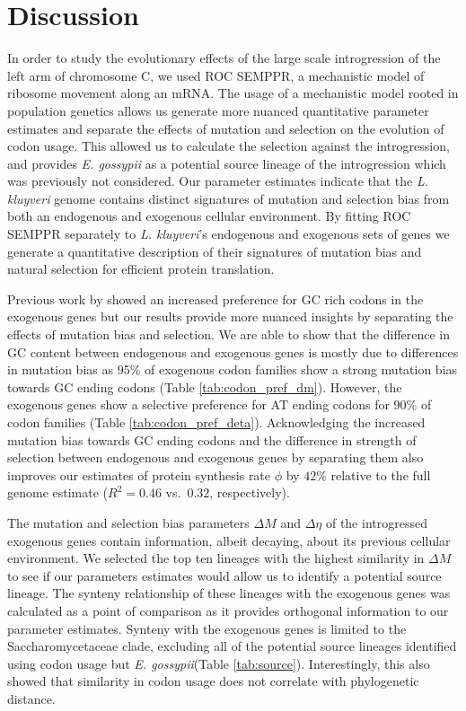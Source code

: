 \documentclass{bmcart}
\newcommand{\kluyveri}{\textit{L. kluyveri}\xspace}
\newcommand{\gossypii}{\textit{E. gossypii}\xspace}
\newcommand{\ROC}{ROC SEMPPR\xspace}
\newcommand{\GC}{GC content\xspace}
\newcommand{\DM}{\ensuremath{{\Delta M}}\xspace}
\newcommand{\DE}{\ensuremath{{\Delta \eta}}\xspace}
\begin{document}
\section*{Discussion}
In order to study the evolutionary effects of the large scale introgression of the left arm of chromosome C, we used \ROC, a mechanistic model of ribosome movement along an mRNA.
The usage of a mechanistic model rooted in population genetics allows us generate more nuanced quantitative parameter estimates and separate the effects of mutation and selection on the evolution of codon usage.
This allowed us to calculate the selection against the introgression, and provides \gossypii as a potential source lineage of the introgression which was previously not considered.
Our parameter estimates indicate that the \kluyveri genome contains distinct signatures of mutation and selection bias from both an endogenous and exogenous cellular environment.
By fitting \ROC separately to \kluyveri's endogenous and exogenous sets of genes we generate a quantitative description of their signatures of mutation bias and natural selection for efficient protein translation.

Previous work by \cite{payen2009} showed an increased preference for GC rich codons in the exogenous genes but our results provide more nuanced insights by separating the effects of mutation bias and selection.
We are able to show that the difference in \GC between endogenous and exogenous genes is mostly due to differences in mutation bias as 95\% of exogenous codon families show a strong mutation bias towards GC ending codons (Table \ref{tab:codon_pref_dm}).
However, the exogenous genes show a selective preference for AT ending codons for 90\% of codon families (Table \ref{tab:codon_pref_deta}).
Acknowledging the increased mutation bias towards GC ending codons and the difference in strength of selection between endogenous and exogenous genes by separating them also improves our estimates of protein synthesis rate $\phi$ by $42 \%$ relative to the full genome estimate ($R^2 = 0.46$ vs.~$0.32$, respectively).

The mutation and selection bias parameters \DM and \DE of the introgressed exogenous genes contain information, albeit decaying, about its previous cellular environment.
We selected the top ten lineages with the highest similarity in \DM to see if our parameters estimates would allow us to identify a potential source lineage.
The synteny relationship of these lineages with the exogenous genes was calculated as a point of comparison as it provides orthogonal information to our parameter estimates.
Synteny with the exogenous genes is limited to the Saccharomycetaceae clade, excluding all of the potential source lineages identified using codon usage but \gossypii (Table \ref{tab:source}).
Interestingly, this also showed that similarity in codon usage does not correlate with phylogenetic distance.
\end{document}

